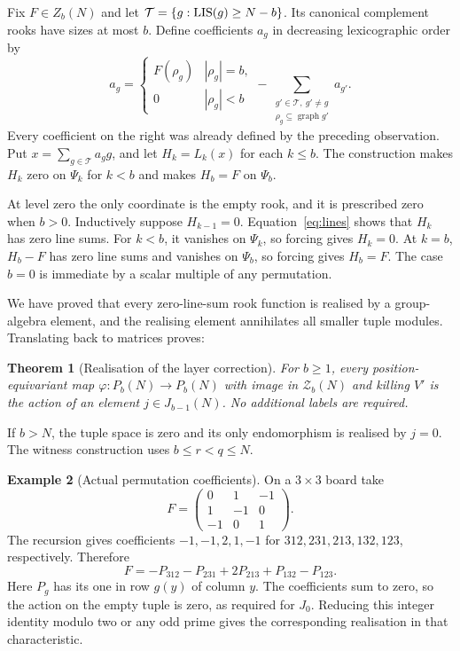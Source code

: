 \documentclass[11pt,a4paper]{article}
\newtheorem{theorem}{Theorem}[section]
\theoremstyle{definition}\newtheorem{definition}[theorem]{Definition}
\newtheorem{example}[theorem]{Example}
\theoremstyle{remark}\newtheorem{remark}[theorem]{Remark}
\begin{document}
Fix $F\in Z_b(N)$ and let $\mathcal T=\{g:\operatorname{LIS}(g)\ge N-b\}$. Its canonical complement rooks have sizes at most $b$. Define coefficients $a_g$ in decreasing lexicographic order by
\begin{equation}\label{eq:triangular}
a_g=\begin{cases}F(\rho_g)&|\rho_g|=b,\\0&|\rho_g|<b\end{cases}
-\sum_{\substack{g'\in\mathcal T,\ g'\ne g\\\rho_g\subseteq\operatorname{graph}g'}}a_{g'}.
\end{equation}
Every coefficient on the right was already defined by the preceding observation. Put $x=\sum_{g\in\mathcal T}a_gg$, and let $H_k=L_k(x)$ for each $k\le b$. The construction makes $H_k$ zero on $\Psi_k$ for $k<b$ and makes $H_b=F$ on $\Psi_b$.

At level zero the only coordinate is the empty rook, and it is prescribed zero when $b>0$. Inductively suppose $H_{k-1}=0$. Equation~\eqref{eq:lines} shows that $H_k$ has zero line sums. For $k<b$, it vanishes on $\Psi_k$, so forcing gives $H_k=0$. At $k=b$, $H_b-F$ has zero line sums and vanishes on $\Psi_b$, so forcing gives $H_b=F$. The case $b=0$ is immediate by a scalar multiple of any permutation.

We have proved that every zero-line-sum rook function is realised by a group-algebra element, and the realising element annihilates all smaller tuple modules. Translating back to matrices proves:
\begin{theorem}[Realisation of the layer correction]\label{thm:realization}
For $b\ge1$, every position-equivariant map $\varphi:P_b(N)\to P_b(N)$ with image in $\mathcal Z_b(N)$ and killing $V'$ is the action of an element $j\in J_{b-1}(N)$. No additional labels are required.
\end{theorem}
If $b>N$, the tuple space is zero and its only endomorphism is
realised by $j=0$. The witness construction uses $b\le r<q\le N$.

\begin{example}[Actual permutation coefficients]
On a $3\times3$ board take
\[F=\begin{pmatrix}0&1&-1\\1&-1&0\\-1&0&1\end{pmatrix}.
\]
The recursion gives coefficients $-1,-1,2,1,-1$ for $312,231,213,132,123$, respectively. Therefore
\[F=-P_{312}-P_{231}+2P_{213}+P_{132}-P_{123}.
\]
Here $P_g$ has its one in row $g(y)$ of column $y$. The coefficients sum to zero, so the action on the empty tuple is zero, as required for $J_0$. Reducing this integer identity modulo two or any odd prime gives the corresponding realisation in that characteristic.
\end{example}
\end{document}
